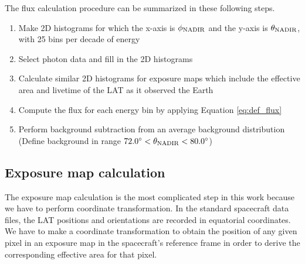 The flux calculation procedure can be summarized in these following steps.
\begin{enumerate}
    \item Make 2D histograms for which the x-axis is $\phi_{\rm NADIR}$
    and the y-axis is $\theta_{\rm NADIR}$, with 25 bins per
    decade of energy
    \item Select photon data and fill in the 2D histograms
    \item Calculate similar 2D histograms for exposure maps
    which include the effective area
    and livetime of the LAT as it observed the Earth
    \item Compute the flux for each energy bin by
    applying Equation \ref{eq:def_flux}
    \item Perform background subtraction from an average
    background distribution (Define background in range
    $72.0^\circ < \theta_{\rm NADIR} < 80.0^\circ$)
\end{enumerate}


\subsection{Exposure map calculation}

The exposure map calculation is the most complicated step in
this work because we have to perform coordinate transformation.
In the standard spacecraft data files, the LAT positions and
orientations are recorded in equatorial coordinates.
We have to make a coordinate transformation to obtain the
position of any given pixel in an exposure map in the
spacecraft's reference frame in order to derive the
corresponding effective area for that pixel.

